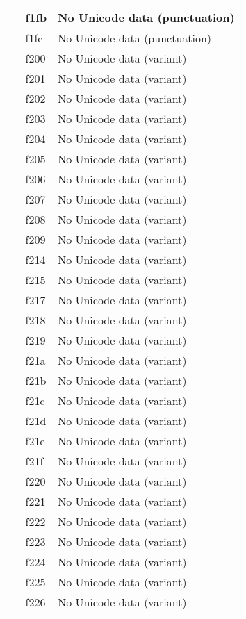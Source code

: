 \documentclass[12pt,letterpaper,openany]{book}
\begin{document}
\begin{center}
\begin{supertabular}{|m{0.25in}|m{0.5in}|m{4in}|}
			 & f1fb & No Unicode data (punctuation)\\\hline
			 & f1fc & No Unicode data (punctuation)\\\hline
			 & f200 & No Unicode data (variant)\\\hline
			 & f201 & No Unicode data (variant)\\\hline
			 & f202 & No Unicode data (variant)\\\hline
			 & f203 & No Unicode data (variant)\\\hline
			 & f204 & No Unicode data (variant)\\\hline
			 & f205 & No Unicode data (variant)\\\hline
			 & f206 & No Unicode data (variant)\\\hline
			 & f207 & No Unicode data (variant)\\\hline
			 & f208 & No Unicode data (variant)\\\hline
			 & f209 & No Unicode data (variant)\\\hline
			 & f214 & No Unicode data (variant)\\\hline
			 & f215 & No Unicode data (variant)\\\hline
			 & f217 & No Unicode data (variant)\\\hline
			 & f218 & No Unicode data (variant)\\\hline
			 & f219 & No Unicode data (variant)\\\hline
			 & f21a & No Unicode data (variant)\\\hline
			 & f21b & No Unicode data (variant)\\\hline
			 & f21c & No Unicode data (variant)\\\hline
			 & f21d & No Unicode data (variant)\\\hline
			 & f21e & No Unicode data (variant)\\\hline
			 & f21f & No Unicode data (variant)\\\hline
			 & f220 & No Unicode data (variant)\\\hline
			 & f221 & No Unicode data (variant)\\\hline
			 & f222 & No Unicode data (variant)\\\hline
			 & f223 & No Unicode data (variant)\\\hline
			 & f224 & No Unicode data (variant)\\\hline
			 & f225 & No Unicode data (variant)\\\hline
			 & f226 & No Unicode data (variant)\\\hline

\end{supertabular}
\end{center}
\end{document}
